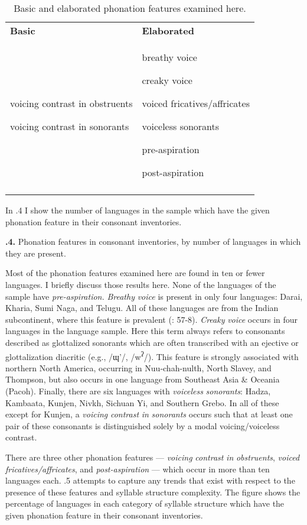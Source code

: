 \begin{table}
\begin{tabularx}{\textwidth}{XX}
\lsptoprule

\textbf{Basic} & \textbf{Elaborated}\\
voicing contrast in obstruents

voicing contrast in sonorants & breathy voice

creaky voice

voiced fricatives/affricates

voiceless sonorants

pre-aspiration

post-aspiration\\
\lspbottomrule
\end{tabularx}
\caption{\label{4.12}Basic and elaborated phonation features examined here.}
\end{table}

  In .4 I show the number of languages in the sample which have the given phonation feature in their consonant inventories.

\textbf{.4.} Phonation features in consonant inventories, by number of languages in which they are present.

  Most of the phonation features examined here are found in ten or fewer languages. I briefly discuss those results here. None of the languages of the sample have \textit{pre-aspiration.} \textit{Breathy} \textit{voice} is present in only four languages: Darai, Kharia, Sumi Naga, and Telugu. All of these languages are from the Indian subcontinent, where this feature is prevalent (\citealt{LadefogedMaddieson1996}: 57-8). \textit{Creaky} \textit{voice} occurs in four languages in the language sample. Here this term always refers to consonants described as glottalized sonorants which are often transcribed with an ejective or glottalization diacritic (e.g., /ɰ’/, /w\textsuperscript{ʔ}/). This feature is strongly associated with northern North America, occurring in Nuu-chah-nulth, North Slavey, and Thompson, but also occurs in one language from Southeast Asia \& Oceania (Pacoh). Finally, there are six languages with \textit{voiceless} \textit{sonorants}: Hadza, Kambaata, Kunjen, Nivkh, Sichuan Yi, and Southern Grebo. In all of these except for Kunjen, a \textit{voicing} \textit{contrast} \textit{in} \textit{sonorants} occurs such that at least one pair of these consonants is distinguished solely by a modal voicing/voiceless contrast.

  There are three other phonation features — \textit{voicing} \textit{contrast} \textit{in} \textit{obstruents}, \textit{voiced} \textit{fricatives/affricates}, and \textit{post-aspiration} — which occur in more than ten languages each. .5 attempts to capture any trends that exist with respect to the presence of these features and syllable structure complexity. The figure shows the percentage of languages in each category of syllable structure which have the given phonation feature in their consonant inventories.

